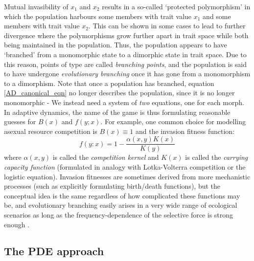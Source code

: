 Mutual invasibility of $x_1$ and $x_2$ results in a so-called `protected polymorphism' in which the population harbours some members with trait value $x_1$ and some members with trait value $x_2$. This can be shown in some cases to lead to further divergence where the polymorphisms grow further apart in trait space while both being maintained in the population. Thus, the population appears to have `branched' from a monomorphic state to a dimorphic state in trait space. Due to this reason, points of type  are called \emph{branching points}, and the population is said to have undergone \emph{evolutionary branching} once it has gone from a monomorphism to a dimorphism. Note that once a population has branched, equation \eqref{AD_canonical_eqn} no longer describes the population, since it is no longer monomorphic - We instead need a system of \emph{two} equations, one for each morph.\\
In adaptive dynamics, the name of the game is thus formulating reasonable guesses for $B(x)$ and $f(y;x)$. For example, one common choice for modelling asexual resource competition is $B(x) \equiv 1$ and the invasion fitness function:
\begin{equation}
\label{AD_cts_logistic_invasion_fitness}
f(y:x) = 1 - \frac{\alpha(x,y)K(x)}{K(y)}
\end{equation}
where $\alpha(x,y)$ is called the \emph{competition kernel} and $K(x)$ is called the \emph{carrying capacity function} (formulated in analogy with Lotka-Volterra competition or the logistic equation). Invasion fitnesses are sometimes derived from more mechanistic processes (such as explicitly formulating birth/death functions), but the conceptual idea is the same regardless of how complicated these functions may be, and evolutionary branching easily arises in a very wide range of ecological scenarios as long as the frequency-dependence of the selective force is strong enough \citep{doebeli_evolutionary_2000,doebeli_adaptive_2011}.

\subsection{The PDE approach}

